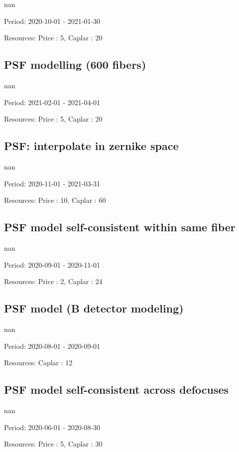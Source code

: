 nan

Period: 2020-10-01 - 2021-01-30

Resources: Price : 5, Caplar : 20

\subsection{PSF modelling (600 fibers)}

nan

Period: 2021-02-01 - 2021-04-01

Resources: Price : 5, Caplar : 20

\subsection{PSF: interpolate in zernike space}

nan

Period: 2020-11-01 - 2021-03-31

Resources: Price : 10, Caplar : 60

\subsection{PSF model self-consistent within same fiber}

nan

Period: 2020-09-01 - 2020-11-01

Resources: Price : 2, Caplar : 24

\subsection{PSF model (B detector modeling)}

nan

Period: 2020-08-01 - 2020-09-01

Resources: Caplar : 12

\subsection{PSF model self-consistent across defocuses}

nan

Period: 2020-06-01 - 2020-08-30

Resources: Price : 5, Caplar : 30

